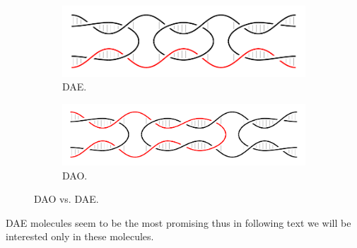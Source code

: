 		\begin{figure}[h]
		\begin{center}
			\begin{subfigure}[b]{0.351\textwidth}
				\includegraphics[width=\textwidth]{./figures/dao-dae/dae.pdf}
				\caption{DAE.}
				\label{fig:dao}
			\end{subfigure}
			\begin{subfigure}[b]{0.405\textwidth}
				\includegraphics[width=\textwidth]{./figures/dao-dae/dao.pdf}
				\caption{DAO.}
				\label{fig:dae}
			\end{subfigure}
			\caption{DAO vs. DAE.}
			\label{fig:dao-dae}
		\end{center}
		\end{figure}
		
		
		
		DAE molecules seem to be the most promising %
		thus in following text we will be interested only in these molecules.
		
		
		
		
